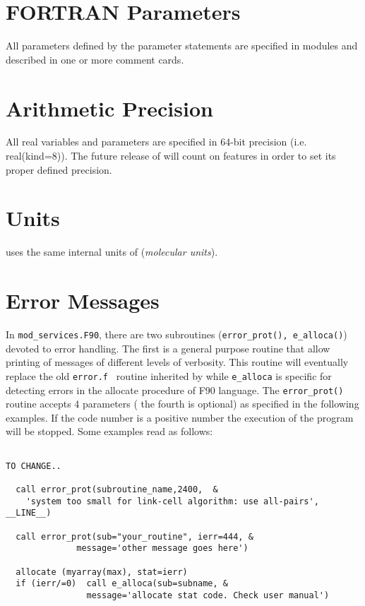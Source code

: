 \section{FORTRAN Parameters}
All parameters defined by the \fort parameter statements are specified
in modules and described in one or more comment cards.

\section{Arithmetic Precision}
All real variables and parameters are specified in 64-bit precision 
(i.e. real(kind=8)). 
The future release of \PR will count on \fort features in order to set its
proper defined precision. 


\section{Units}
\PR uses the same internal units of \D ({\it molecular units}). 

\section{Error Messages}

In \verb=mod_services.F90=, there are two subroutines ({\tt error\_prot(),
e\_alloca()}) devoted to error handling. The first is a general purpose
routine that allow printing of messages of different levels of
verbosity. This routine will eventually replace the old {\tt error.f } routine
inherited by \D while  {\tt e\_alloca} is specific for detecting
errors in the allocate procedure of F90 language.
The  {\tt error\_prot()} routine accepts 4 parameters ( the fourth is
optional) as specified in the following examples. If the code number is a
positive number the execution of the program will be stopped.  
Some examples read as follows:
\begin{verbatim}

TO CHANGE.. 

  call error_prot(subroutine_name,2400,  &
    'system too small for link-cell algorithm: use all-pairs', __LINE__)
 
  call error_prot(sub="your_routine", ierr=444, &
              message='other message goes here')

  allocate (myarray(max), stat=ierr)
  if (ierr/=0)  call e_alloca(sub=subname, &
                message='allocate stat code. Check user manual')

\end{verbatim}

